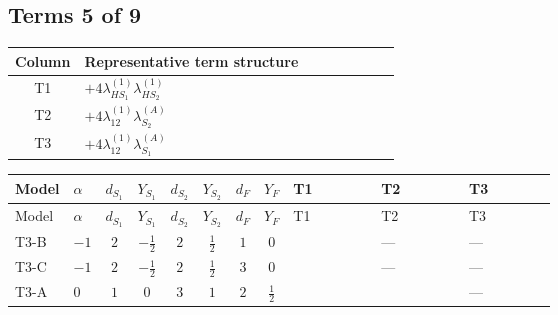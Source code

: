 \documentclass[8pt]{article}
\begin{document}
\begin{landscape}
\subsection*{Terms 5 of 9}
\begin{center}
\begin{tabular}{@{}c >{\raggedright\arraybackslash}p{0.82\linewidth}@{}}
\toprule
Column & Representative term structure \\
\midrule
T1 & \(\displaystyle +4 {\lambda_{HS_1}^{(1)}} {\lambda_{HS_2}^{(1)}}\) \\
\midrule
T2 & \(\displaystyle +4 {\lambda_{12}^{(1)}} {\lambda_{S_2}^{(A)}}\) \\
\midrule
T3 & \(\displaystyle +4 {\lambda_{12}^{(1)}} {\lambda_{S_1}^{(A)}}\) \\
\midrule
\bottomrule
\end{tabular}
\end{center}
\smallskip
\tiny
\begin{longtable}{@{}llcccccc >{\raggedright\arraybackslash}p{0.21\linewidth} >{\raggedright\arraybackslash}p{0.21\linewidth} >{\raggedright\arraybackslash}p{0.21\linewidth}@{}}
\toprule
Model & $\alpha$ & $d_{S_1}$ & $Y_{S_1}$ & $d_{S_2}$ & $Y_{S_2}$ & $d_F$ & $Y_F$ & T1 & T2 & T3 \\
\midrule
\endfirsthead
\toprule
Model & $\alpha$ & $d_{S_1}$ & $Y_{S_1}$ & $d_{S_2}$ & $Y_{S_2}$ & $d_F$ & $Y_F$ & T1 & T2 & T3 \\
\midrule
\endhead
T3-B & $-1$ & $2$ & $-\frac{1}{2}$ & $2$ & $\frac{1}{2}$ & $1$ & $0$ & \scriptsize\adjustbox{max width=\linewidth}{$\begin{gathered} +4 {\lambda_{HS_1}^{(1)}} {\lambda_{HS_2}^{(1)}}\end{gathered}$} & --- & --- \\
\midrule
T3-C & $-1$ & $2$ & $-\frac{1}{2}$ & $2$ & $\frac{1}{2}$ & $3$ & $0$ & \scriptsize\adjustbox{max width=\linewidth}{$\begin{gathered} +4 {\lambda_{HS_1}^{(1)}} {\lambda_{HS_2}^{(1)}}\end{gathered}$} & --- & --- \\
\midrule
T3-A & $0$ & $1$ & $0$ & $3$ & $1$ & $2$ & $\frac{1}{2}$ & \scriptsize\adjustbox{max width=\linewidth}{$\begin{gathered} +4 {\lambda_{HS_1}^{(1)}} {\lambda_{HS_2}^{(1)}}\end{gathered}$} & \scriptsize\adjustbox{max width=\linewidth}{$\begin{gathered} +4 {\lambda_{12}^{(1)}} {\lambda_{S_2}^{(A)}}\end{gathered}$} & --- \\

\end{longtable}
\end{landscape}
\end{document}
